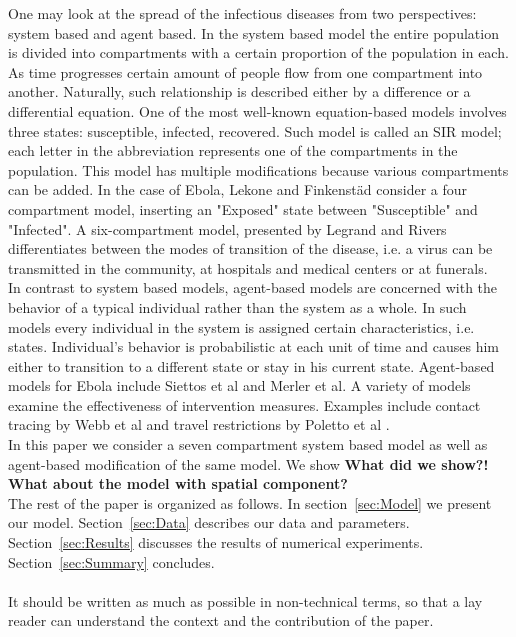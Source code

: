 \documentclass[10pt]{article}
\begin{document}
One may look at the spread of the infectious diseases from two perspectives: system based and agent based. In the system based model the entire population is divided into compartments with a certain proportion of the population in each. As time progresses certain amount of people flow from one compartment into another. Naturally, such relationship is described either by a difference or a differential equation. One of the most well-known equation-based models involves three states: susceptible, infected, recovered. Such model is called an SIR model; each letter in the abbreviation represents one of the compartments in the population. This model has multiple modifications because various compartments can be added. In the case of Ebola, Lekone and Finkenstäd \cite{Lekone2006} consider a four compartment model, inserting an "Exposed" state between "Susceptible" and "Infected". A six-compartment model, presented by Legrand \cite{Legrand2007} and Rivers\cite{Rivers2014} differentiates between the modes of transition of the disease, i.e. a virus can be transmitted in the community, at hospitals and medical centers or at funerals.\\
In contrast to system based models, agent-based models are concerned with the behavior of a typical individual rather than the system as a whole. In such models every individual in the system is assigned certain characteristics, i.e. states. Individual's behavior is probabilistic at each unit of time and causes him either to transition to a different state or stay in his current state. Agent-based models for Ebola include Siettos et al \cite{Siettos2015} and Merler et al\cite{Merler2015}. A variety of models examine the effectiveness of intervention measures. Examples include contact tracing by Webb et al \cite{Webb2015} and travel restrictions by Poletto et al \cite{Poletto2014}.\\
In this paper we consider a seven compartment system based model as well as agent-based modification of the same model. We show \textbf{What did we show?!} \textbf{What about the model with spatial component?}\\
The rest of the paper is organized as follows. In section~\ref{sec:Model} we present our model. Section~\ref{sec:Data} describes our data and parameters. Section~\ref{sec:Results} discusses the results of numerical experiments. Section~\ref{sec:Summary} concludes.\\\\

It should be written as much as possible in non-technical terms, so that a
lay reader can understand the context and the contribution of the paper.
\end{document}
